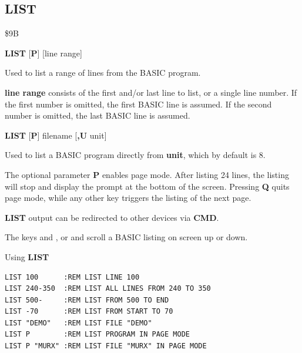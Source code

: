 \subsection{LIST}
\begin{description}[leftmargin=2cm,style=nextline]
\item [Token:] \$9B
\item [Format:] {\bf LIST} [{\bf P}] [line range]

\item [Usage:] Used to list a range of lines from the BASIC program.

               {\bf line range} consists of the first and/or last
               line to list, or a single line number.
               If the first number is omitted, the
               first BASIC line is assumed.
               If the second number is omitted, the last BASIC line
               is assumed.

\item [Format:] {\bf LIST} [{\bf P}] filename [{\bf,U} unit]

\item [Usage:] Used to list a BASIC program directly from {\bf unit},
               which by default is 8.

\item [Remarks:]

                The optional parameter {\bf P} enables page mode.
                After listing 24 lines, the listing will stop and display
                the prompt \screentext{[MORE]} at the bottom of the screen.
                Pressing {\bf Q} quits page mode, while any other key
                triggers the listing of the next page.

                {\bf LIST} output can be redirected
                to other devices via {\bf CMD}.

                The keys  and , or
                   and
                  
                scroll a BASIC listing on screen up or down.

\item [Examples:] Using {\bf LIST}
\begin{tcolorbox}[colback=black,coltext=white]
\verbatimfont{\codefont}
\begin{verbatim}
LIST 100      :REM LIST LINE 100
LIST 240-350  :REM LIST ALL LINES FROM 240 TO 350
LIST 500-     :REM LIST FROM 500 TO END
LIST -70      :REM LIST FROM START TO 70
LIST "DEMO"   :REM LIST FILE "DEMO"
LIST P        :REM LIST PROGRAM IN PAGE MODE
LIST P "MURX" :REM LIST FILE "MURX" IN PAGE MODE
\end{verbatim}
\end{tcolorbox}
\end{description}

